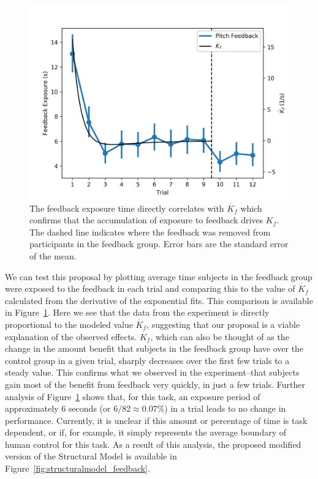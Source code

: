 \begin{figure}[tb]
    \centering
    \includegraphics[width=0.8\linewidth]{figures/Modeling/f_v_kfd.png}
    \caption[The feedback exposure time directly correlates with $\dot{K_{f}}$]{The feedback exposure time directly correlates with $\dot{K_{f}}$ which confirms that the accumulation of exposure to feedback drives $K_f$.
    The dashed line indicates where the feedback was removed from participants in the feedback group.
    Error bars are the standard error of the mean.}
    \label{fig:feedback_kfd}
\end{figure}

We can test this proposal by plotting average time subjects in the feedback group were exposed to the feedback in each trial and comparing this to the value of $\dot{K_f}$ calculated from the derivative of the exponential fits.
This comparison is available in Figure~\ref{fig:feedback_kfd}.
Here we see that the data from the experiment is directly proportional to the modeled value $\dot{K_f}$, suggesting that our proposal is a viable explanation of the observed effects.
$\dot{K_f}$, which can also be thought of as the change in the amount benefit that subjects in the feedback group have over the control group in a given trial, sharply decreases over the first few trials to a steady value.
This confirms what we observed in the experiment--that subjects gain most of the benefit from feedback very quickly, in just a few trials.
Further analysis of Figure~\ref{fig:feedback_kfd} shows that, for this task, an exposure period of approximately 6 seconds (or $6/82\approx0.07\%$) in a trial leads to no change in performance.
Currently, it is unclear if this amount or percentage of time is task dependent, or if, for example, it simply represents the average boundary of human control for this task.
As a result of this analysis, the proposed modified version of the Structural Model is available in Figure~\ref{fig:structuralmodel_feedback}.

